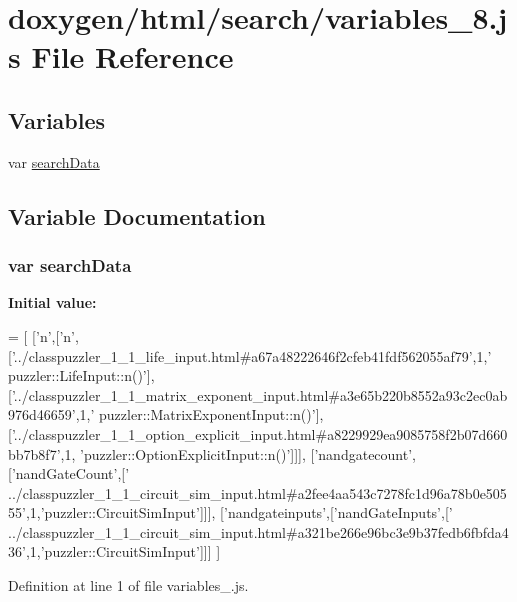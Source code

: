 \hypertarget{a00112}{}\section{doxygen/html/search/variables\+\_\+8.js File Reference}
\label{a00112}
\subsection*{Variables}
\begin{DoxyCompactItemize}
\item 
var \hyperlink{a00112_ad01a7523f103d6242ef9b0451861231e}{search\+Data}
\end{DoxyCompactItemize}


\subsection{Variable Documentation}
\hypertarget{a00112_ad01a7523f103d6242ef9b0451861231e}{}
\subsubsection[{search\+Data}]{\setlength{\rightskip}{0pt plus 5cm}var search\+Data}\label{a00112_ad01a7523f103d6242ef9b0451861231e}
{\bfseries Initial value\+:}
\begin{DoxyCode}
=
[
  [\textcolor{charliteral}{'n'},[\textcolor{charliteral}{'n'},[\textcolor{stringliteral}{'../classpuzzler\_1\_1\_life\_input.html#a67a48222646f2cfeb41fdf562055af79'},1,\textcolor{stringliteral}{'
      puzzler::LifeInput::n()'}],[\textcolor{stringliteral}{'../classpuzzler\_1\_1\_matrix\_exponent\_input.html#a3e65b220b8552a93c2ec0ab976d46659'},1,\textcolor{stringliteral}{'
      puzzler::MatrixExponentInput::n()'}],[\textcolor{stringliteral}{'../classpuzzler\_1\_1\_option\_explicit\_input.html#a8229929ea9085758f2b07d660bb7b8f7'},1,\textcolor{stringliteral}{
      'puzzler::OptionExplicitInput::n()'}]]],
  [\textcolor{stringliteral}{'nandgatecount'},[\textcolor{stringliteral}{'nandGateCount'},[\textcolor{stringliteral}{'
      ../classpuzzler\_1\_1\_circuit\_sim\_input.html#a2fee4aa543c7278fc1d96a78b0e50555'},1,\textcolor{stringliteral}{'puzzler::CircuitSimInput'}]]],
  [\textcolor{stringliteral}{'nandgateinputs'},[\textcolor{stringliteral}{'nandGateInputs'},[\textcolor{stringliteral}{'
      ../classpuzzler\_1\_1\_circuit\_sim\_input.html#a321be266e96bc3e9b37fedb6fbfda436'},1,\textcolor{stringliteral}{'puzzler::CircuitSimInput'}]]]
]
\end{DoxyCode}


Definition at line 1 of file variables\+\_.\+js.

